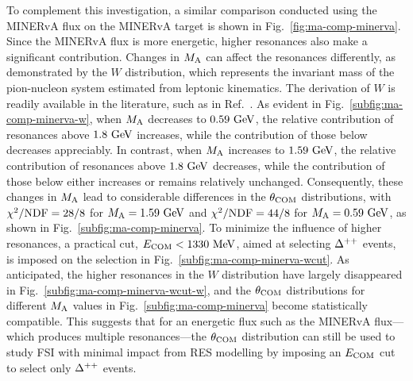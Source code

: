      To complement this investigation, a similar comparison conducted using the MINERvA flux on the MINERvA target is shown in Fig.~\ref{fig:ma-comp-minerva}. 
     Since the MINERvA flux is more energetic, higher resonances also make a significant contribution.
     Changes in $M_{\textrm{A}}$ can affect the resonances differently, as demonstrated by the $W$ distribution, which represents the invariant mass of the pion-nucleon system estimated from leptonic kinematics. 
     The derivation of $W$ is readily available in the literature, such as in Ref.~\cite{Paschos:2003qr}.
     As evident in Fig.~\ref{subfig:ma-comp-minerva-w}, when $M_{\textrm{A}}$ decreases to $0.59~\textrm{GeV}$, the relative contribution of resonances above $1.8~\textrm{GeV}$ increases, while the contribution of those below decreases appreciably.
     In contrast, when $M_{\textrm{A}}$ increases to $1.59~\textrm{GeV}$, the relative contribution of resonances above $1.8~\textrm{GeV}$ decreases, while the contribution of those below either increases or remains relatively unchanged.
     Consequently, these changes in $M_{\textrm{A}}$ lead to considerable differences in the $\theta_{\textrm{COM}}$ distributions, with $\chi^2/{\textrm{NDF}}=28/8$ for $M_{\textrm{A}}=1.59~\textrm{GeV}$ and $\chi^2/{\textrm{NDF}}=44/8$ for $M_{\textrm{A}}=0.59~\textrm{GeV}$, as shown in Fig.~\ref{subfig:ma-comp-minerva}.
     To minimize the influence of higher resonances, a practical cut, $E_{\textrm{COM}}<1330~\textrm{MeV}$, aimed at selecting $\Delta^{++}$ events, is imposed on the selection in Fig.~\ref{subfig:ma-comp-minerva-wcut}.
     As anticipated, the higher resonances in the $W$ distribution have largely disappeared in Fig.~\ref{subfig:ma-comp-minerva-wcut-w}, and the $\theta_{\textrm{COM}}$ distributions for different $M_{\textrm{A}}$ values in Fig.~\ref{subfig:ma-comp-minerva} become statistically compatible.
     This suggests that for an energetic flux such as the MINERvA flux—which produces multiple resonances—the $\theta_{\textrm{COM}}$ distribution can still be used to study FSI with minimal impact from RES modelling by imposing an $E_{\textrm{COM}}$ cut to select only $\Delta^{++}$ events.
